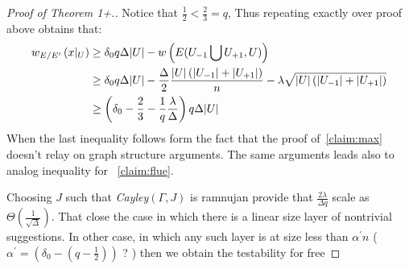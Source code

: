 \begin{proof}[Proof of Theorem 1+.] Notice that $\frac{1}{2} < \frac{2}{3} = q$, Thus repeating exactly over proof above obtains that: 
  \begin{equation*}
    \begin{split}
      w_{E/E^{\prime}}  \left( x|_{U} \right)  & \ge  \delta_{0}q\Delta|U| - w\left( E(U_{-1} \bigcup U_{+1} ,U) \right)  \\ 
      & \ge   \delta_{0}q\Delta|U| - \frac{\Delta}{2} \frac{|U|\left( |U_{-1}| + |U_{+1}| \right)}{n} -\lambda\sqrt{|U|\left( |U_{-1}| + |U_{+1}| \right)} \\ 
      & \ge  \left( \delta_{0} - \frac{2}{3} - \frac{1}{q}\frac{\lambda}{\Delta} \right)q\Delta |U|
    \end{split}
  \end{equation*}
  When the last inequality follows form the fact that the proof of~\cref{claim:max} doesn't relay on graph structure arguments. The same arguments leads also to analog inequality for ~\cref{claim:flue}.

  Choosing $J$ such that \emph{Cayley}$\left( \Gamma, J \right)$ is ramnujan provide that $ \frac{2\lambda}{\Delta q}$ scale as $\Theta\left( \frac{1}{\sqrt{\Delta}} \right)$. That close the case in which there is a linear size layer of nontrivial suggestions. In other case, in which any such layer is at size less than $\alpha^{\prime}n$ ( $\alpha^{\prime} = \left( \delta_{0} - \left( q - \frac{1}{2} \right) \right)$ ? ) then we obtain the testability for free
\end{proof}



